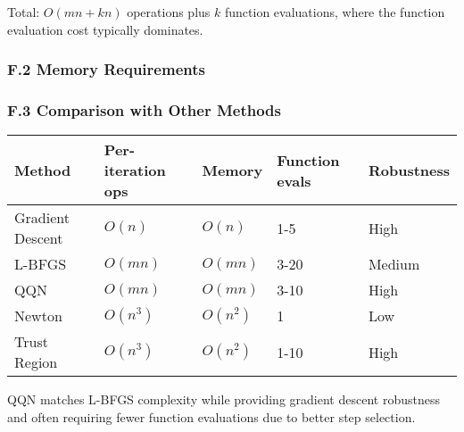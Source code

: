 Total: \(O(mn + kn)\) operations plus \(k\) function evaluations, where the function evaluation cost typically dominates.

\hypertarget{f.2-memory-requirements}{%
\subsubsection{F.2 Memory Requirements}\label{f.2-memory-requirements}}

\hypertarget{f.3-comparison-with-other-methods}{%
\subsubsection{F.3 Comparison with Other Methods}\label{f.3-comparison-with-other-methods}}

\begin{longtable}[]{@{}lllll@{}}
\toprule\noalign{}
Method & Per-iteration ops & Memory & Function evals & Robustness \\
\midrule\noalign{}
\endhead
\bottomrule\noalign{}
\endlastfoot
Gradient Descent & \(O(n)\) & \(O(n)\) & 1-5 & High \\
L-BFGS & \(O(mn)\) & \(O(mn)\) & 3-20 & Medium \\
QQN & \(O(mn)\) & \(O(mn)\) & 3-10 & High \\
Newton & \(O(n^3)\) & \(O(n^2)\) & 1 & Low \\
Trust Region & \(O(n^3)\) & \(O(n^2)\) & 1-10 & High \\
\end{longtable}

QQN matches L-BFGS complexity while providing gradient descent robustness and often requiring fewer function evaluations due to better step selection.

